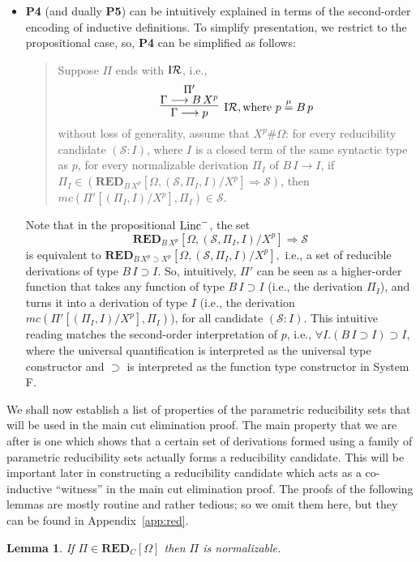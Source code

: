 \documentclass[preprint]{elsarticle}
\def\Sscr{{\mathcal S}}
\newcommand{\Linc}{{\rm Linc}^-}
\newcommand{\Seq}[2]{#1\longrightarrow #2}
\newcommand{\defmu}{\stackrel{\mu}{=}}
\newcommand{\indR}{{\rm I}{\cal R}}
\newcommand{\oimp}{\supset}
\def\RED{{\mathbf{RED}}}
\newtheorem{lemma}[thm]{Lemma}
\begin{document}
\begin{itemize}
\item 
  {\bf P4} (and dually \textbf{P5}) can be intuitively explained in
  terms of the second-order encoding of inductive definitions.  To
  simplify presentation, we restrict to the propositional case, so,
  {\bf P4} can be simplified as follows:
\begin{quote}
Suppose $\Pi$ ends with $\indR$, i.e., 
    $$
    \infer[\indR, \hbox{where $p \defmu B\,p$}]
    {\Seq \Gamma {p} }
    {\deduce{\Seq \Gamma {B\,X^p}}{\Pi'}}
    $$
    without loss of generality, assume that $X^p \# \Omega$: for
    every reducibility candidate $(\Sscr : I)$, where $I$ is a closed
    term of the same syntactic type as $p$, for every normalizable
    derivation $\Pi_I$ of $\Seq {B\,I} {I}$, if
    $
    \Pi_I \in (\RED_{B\,X^p}[\Omega, (\Sscr, \Pi_I, I)/X^p] \Rightarrow \Sscr) 
    $,
    then 
    $mc(\Pi'[(\Pi_I,I)/X^p], \Pi_I)  \in \Sscr$.
\end{quote}
Note that in the propositional $\Linc$, the set 
$$\RED_{B\,X^p}[\Omega, (\Sscr, \Pi_I, I)/X^p] \Rightarrow \Sscr$$
is equivalent to $\RED_{B\,X^p \oimp X^p}[\Omega, (\Sscr, \Pi_I,
I)/X^p],$ i.e., a set of reducible derivations of type $B\,I \oimp I$.
So, intuitively, $\Pi'$ can be seen as a higher-order function that
takes any function of type $B\,I \oimp I$ (i.e., the derivation
$\Pi_I$), and turns it into a derivation of type $I$ (i.e., the
derivation $mc(\Pi'[(\Pi_I,I)/X^p], \Pi_I)$), for all candidate
$(\Sscr : I)$. This intuitive reading matches the second-order
interpretation of $p$, i.e., $\forall I. (B\,I \oimp I) \oimp I$,
where the universal quantification is interpreted as the universal
type constructor and $\oimp$ is interpreted as the function type
constructor in System F.
\end{itemize}


\medskip
We shall now establish a list of properties of the parametric reducibility
sets that will be used in the main cut elimination proof. 
The main property that we are after is one which shows that a certain
set of derivations formed using a family of parametric reducibility sets 
actually forms a reducibility candidate. This will be important later
in constructing a reducibility candidate which acts as a co-inductive
``witness'' in the main cut elimination proof. 
The proofs of the following lemmas are mostly routine and rather tedious;
so we omit them here, but they can be found in Appendix~\ref{app:red}.


\begin{lemma}
  \label{lm:red-norm}
If $\Pi \in \RED_C[\Omega]$ then $\Pi$ is normalizable.
\end{lemma}
\end{document}
